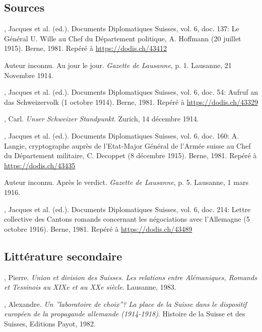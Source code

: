 \documentclass[french,a4paper]{article}
\begin{document}
\begin{thebibliography}{9}

\subsection*{Sources}

, Jacques et al. (ed.).
Documents Diplomatiques Suisses, vol. 6, doc. 137: \og Le Général U. Wille au Chef du Département politique, A. Hoffmann \fg{} (20 juillet 1915).
Berne, 1981. Repéré à \url{https://dodis.ch/43412}

Auteur inconnu.
Au jour le jour. \textit{Gazette de Lausanne}, p. 1.
Lausanne, 21 Novembre 1914.

, Jacques et al. (ed.).
Documents Diplomatiques Suisses, vol. 6, doc. 54: \og Aufruf an das Schweizervolk \fg{} (1\ier{} octobre 1914).
Berne, 1981.
Repéré à \url{https://dodis.ch/43329}

, Carl.
\textit{Unser Schweizer Standpunkt}.
Zurich, 14 décembre 1914.

, Jacques et al. (ed.).
Documents Diplomatiques Suisses, vol. 6, doc. 160: \og A. Langie, cryptographe auprès de l’Etat-Major Général de l’Armée suisse au Chef du Département militaire, C. Decoppet \fg{} (8 décembre 1915).
Berne, 1981. Repéré à \url{https://dodis.ch/43435}

Auteur inconnu.
Après le verdict. \textit{Gazette de Lausanne}, p. 5.
Lausanne, 1\ier{} mars 1916.

, Jacques et al. (ed.).
Documents Diplomatiques Suisses, vol. 6, doc. 214: \og Lettre collective des Cantons romands concernant les négociations avec l’Allemagne \fg{} (5 octobre 1916).
Berne, 1981. Repéré à \url{https://dodis.ch/43489}

\subsection*{Littérature secondaire}

, Pierre.
\textit{Union et division des Suisses. Les relations entre Alémaniques, Romands et Tessinois au XIXe et au XXe siècle}.
Lausanne, 1983.

, Alexandre.
\textit{Un ”laboratoire de choix”? La place de la Suisse dans le dispositif européen de la propagande allemande (1914-1918)}.
Histoire de la Suisse et des Suisses, Editions Payot, 1982.


\end{thebibliography}
\end{document}
